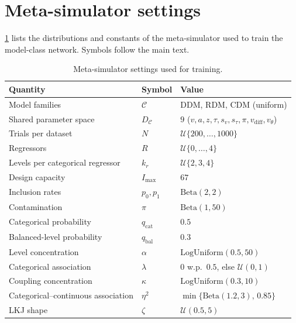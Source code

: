 \documentclass[11pt]{article}
\providecommand{\autoref}[1]{\ref{#1}}
\begin{document}
\appendix
\section{Meta-simulator settings}
\label{app:meta-sim-settings}

\autoref{tab:meta-sim-hyper} lists the distributions and constants of the meta-simulator used to train the model-class network. Symbols follow the main text.

\begin{table}[h]
\centering
\caption{Meta-simulator settings used for training.}
\label{tab:meta-sim-hyper}
\begin{tabular}{lll}
  \toprule
  Quantity & Symbol & Value \\
  \midrule
  Model families               & $\mathcal{C}$          & DDM, RDM, CDM (uniform) \\
  Shared parameter space       & $D_{\mathcal{C}}$      & $9$ ($v, a, z, \tau, s_v, s_\tau, \pi, v_{\mathrm{diff}}, v_\theta$) \\
  Trials per dataset           & $N$                    & $\mathcal{U}\{200, \dots, 1000\}$ \\
  Regressors                   & $R$                    & $\mathcal{U}\{0, \dots, 4\}$ \\
  Levels per categorical regressor & $k_r$              & $\mathcal{U}\{2, 3, 4\}$ \\
  Design capacity              & $I_{\max}$             & $67$ \\
  Inclusion rates              & $p_0, p_1$             & $\mathrm{Beta}(2, 2)$ \\
  Contamination                & $\pi$                  & $\mathrm{Beta}(1, 50)$ \\
  \midrule
  Categorical probability      & $q_{\mathrm{cat}}$     & $0.5$ \\
  Balanced-level probability   & $q_{\mathrm{bal}}$     & $0.3$ \\
  Level concentration          & $\alpha$               & $\mathrm{LogUniform}(0.5, 50)$ \\
  Categorical association      & $\lambda$              & $0$ w.p.\ $0.5$, else $\mathcal{U}(0, 1)$ \\
  Coupling concentration       & $\kappa$               & $\mathrm{LogUniform}(0.3, 10)$ \\
  Categorical--continuous association & $\eta^2$        & $\min\{\mathrm{Beta}(1.2, 3),\, 0.85\}$ \\
  LKJ shape                    & $\zeta$                & $\mathcal{U}(0.5, 5)$ \\
  \bottomrule
\end{tabular}
\end{table}
\end{document}
